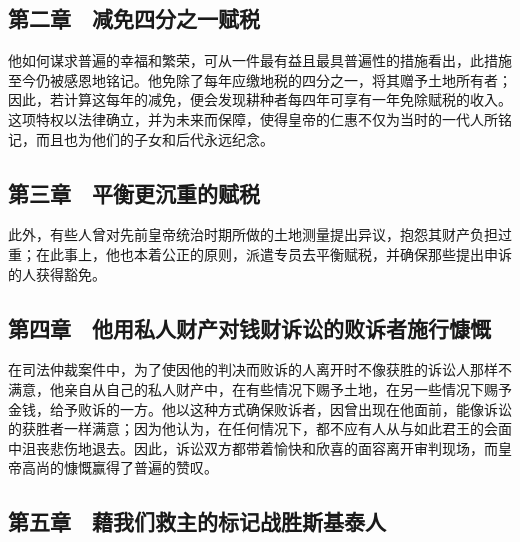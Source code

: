 
\subsection{第二章　减免四分之一赋税}

他如何谋求普遍的幸福和繁荣，可从一件最有益且最具普遍性的措施看出，此措施至今仍被感恩地铭记。他免除了每年应缴地税的四分之一，将其赠予土地所有者；因此，若计算这每年的减免，便会发现耕种者每四年可享有一年免除赋税的收入。这项特权以法律确立，并为未来而保障，使得皇帝的仁惠不仅为当时的一代人所铭记，而且也为他们的子女和后代永远纪念。\par


\subsection{第三章　平衡更沉重的赋税}

此外，有些人曾对先前皇帝统治时期所做的土地测量提出异议，抱怨其财产负担过重；在此事上，他也本着公正的原则，派遣专员去平衡赋税，并确保那些提出申诉的人获得豁免。\par


\subsection{第四章　他用私人财产对钱财诉讼的败诉者施行慷慨}

在司法仲裁案件中，为了使因他的判决而败诉的人离开时不像获胜的诉讼人那样不满意，他亲自从自己的私人财产中，在有些情况下赐予土地，在另一些情况下赐予金钱，给予败诉的一方。他以这种方式确保败诉者，因曾出现在他面前，能像诉讼的获胜者一样满意；因为他认为，在任何情况下，都不应有人从与如此君王的会面中沮丧悲伤地退去。因此，诉讼双方都带着愉快和欣喜的面容离开审判现场，而皇帝高尚的慷慨赢得了普遍的赞叹。\par


\subsection{第五章　藉我们救主的标记战胜斯基泰人}

